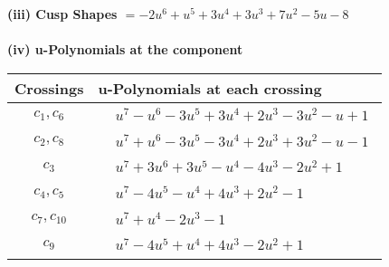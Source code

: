 \documentclass[1p]{elsarticle_modified}
\theoremstyle{definition}
\begin{document}
\flushleft \textbf{(iii) Cusp Shapes $= -2 u^6+u^5+3 u^4+3 u^3+7 u^2-5 u-8$}\\~\\
\newpage\renewcommand{\arraystretch}{1}
\flushleft \textbf{(iv) u-Polynomials at the component}\newline \\
\begin{tabular}{m{50pt}|m{274pt}}
Crossings & \hspace{64pt}u-Polynomials at each crossing \\
\hline $$\begin{aligned}c_{1},c_{6}\end{aligned}$$&$\begin{aligned}
&u^7- u^6-3 u^5+3 u^4+2 u^3-3 u^2- u+1
\end{aligned}$\\
\hline $$\begin{aligned}c_{2},c_{8}\end{aligned}$$&$\begin{aligned}
&u^7+u^6-3 u^5-3 u^4+2 u^3+3 u^2- u-1
\end{aligned}$\\
\hline $$\begin{aligned}c_{3}\end{aligned}$$&$\begin{aligned}
&u^7+3 u^6+3 u^5- u^4-4 u^3-2 u^2+1
\end{aligned}$\\
\hline $$\begin{aligned}c_{4},c_{5}\end{aligned}$$&$\begin{aligned}
&u^7-4 u^5- u^4+4 u^3+2 u^2-1
\end{aligned}$\\
\hline $$\begin{aligned}c_{7},c_{10}\end{aligned}$$&$\begin{aligned}
&u^7+u^4-2 u^3-1
\end{aligned}$\\
\hline $$\begin{aligned}c_{9}\end{aligned}$$&$\begin{aligned}
&u^7-4 u^5+u^4+4 u^3-2 u^2+1
\end{aligned}$\\
\hline
\end{tabular}\\~\\
\newpage\renewcommand{\arraystretch}{1}
\end{document}
